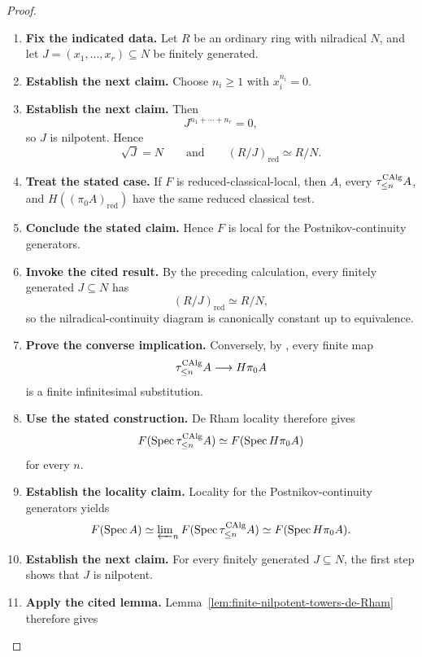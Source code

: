 \begin{proof}
\leavevmode
\begin{enumerate}[label=\textup{(\arabic*)}]
    \item \textbf{Fix the indicated data.}
    Let \(R\) be an ordinary ring with nilradical \(N\), and let
    \(J=(x_1,\ldots,x_r)\subseteq N\) be finitely generated.
    \item \textbf{Establish the next claim.}
    Choose
    \(n_i\geq1\) with \(x_i^{n_i}=0\).
    \item \textbf{Establish the next claim.}
    Then
    \[
    J^{n_1+\cdots+n_r}=0,
    \]
    so \(J\) is nilpotent.
    Hence
    \[
    \sqrt{J}=N
    \qquad\text{and}\qquad
    (R/J)_{\mathrm{red}}\simeq R/N.
    \]
    \item \textbf{Treat the stated case.}
    If \(F\) is reduced-classical-local, then \(A\), every
    \(\tau_{\leq n}^{\operatorname{CAlg}}A\), and
    \(H((\pi_0A)_{\mathrm{red}})\) have the same reduced classical test.
    \item \textbf{Conclude the stated claim.}
    Hence
    \(F\) is local for the Postnikov-continuity generators.
    \item \textbf{Invoke the cited result.}
    By the preceding
    calculation, every finitely generated \(J\subseteq N\) has
    \[
    (R/J)_{\mathrm{red}}\simeq R/N,
    \]
    so the nilradical-continuity diagram is canonically constant up to equivalence.
    \item \textbf{Prove the converse implication.}
    Conversely, by , every finite map
    \[
    \tau_{\leq n}^{\operatorname{CAlg}}A\longrightarrow H\pi_0A
    \]
    is a finite infinitesimal substitution.
    \item \textbf{Use the stated construction.}
    De Rham locality therefore gives
    \[
    F(\operatorname{Spec}\tau_{\leq n}^{\operatorname{CAlg}}A)
    \simeq
    F(\operatorname{Spec} H\pi_0A)
    \]
    for every \(n\).
    \item \textbf{Establish the locality claim.}
    Locality for the Postnikov-continuity generators yields
    \[
    F(\operatorname{Spec} A)
    \simeq
    \varprojlim\nolimits_nF(\operatorname{Spec}\tau_{\leq n}^{\operatorname{CAlg}}A)
    \simeq
    F(\operatorname{Spec} H\pi_0A).
    \]
    \item \textbf{Establish the next claim.}
    For every finitely generated \(J\subseteq N\), the first step shows that \(J\)
    is nilpotent.
    \item \textbf{Apply the cited lemma.}
    Lemma~\ref{lem:finite-nilpotent-towers-de-Rham} therefore gives
    \[
\]
\end{enumerate}
\end{proof}
